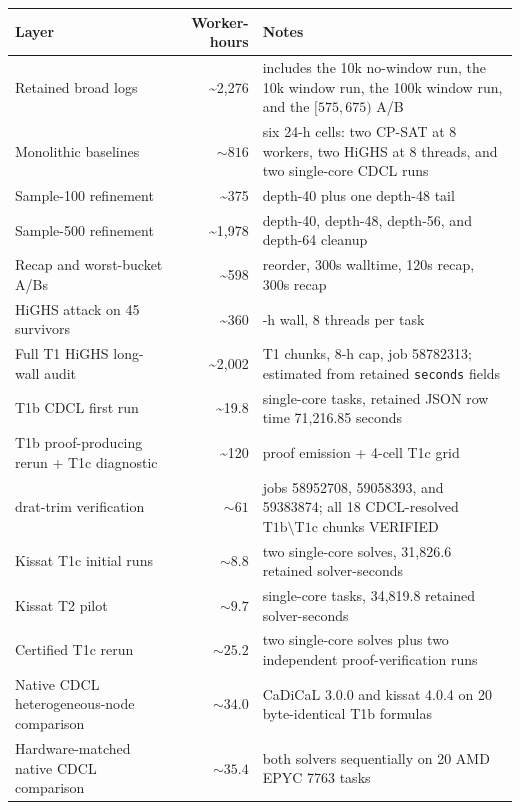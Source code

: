 {\def\LTcaptype{none} %
\begin{longtable}[]{@{}
  >{\raggedright\arraybackslash}p{}
  r
  >{\raggedright\arraybackslash}p{}@{}}
\toprule\noalign{}
Layer & Worker-hours & Notes \\
\midrule\noalign{}
\endhead
\bottomrule\noalign{}
\endlastfoot
Retained broad logs & \textasciitilde{}2,276 & includes the 10k no-window run, the 10k window run, the 100k window run, and the $[575,675)$ A/B \\
Monolithic baselines & $\sim816$ & six 24-h cells: two CP-SAT at 8 workers, two HiGHS at 8 threads, and two single-core CDCL runs \\
Sample-100 refinement & \textasciitilde{}375 & depth-40 plus one depth-48 tail \\
Sample-500 refinement & \textasciitilde{}1,978 & depth-40, depth-48, depth-56, and depth-64 cleanup \\
Recap and worst-bucket A/Bs & \textasciitilde{}598 & reorder, 300s walltime, 120s recap, 300s recap \\
HiGHS attack on 45 survivors & \textasciitilde{}360 & 1-h wall, 8 threads per task \\
Full T1 HiGHS long-wall audit & \textasciitilde{}2,002 & 45 T1 chunks, 8-h cap, job 58782313; estimated from retained \texttt{seconds} fields \\
T1b CDCL first run & \textasciitilde{}19.8 & 20 single-core tasks, retained JSON row time 71,216.85 seconds \\
T1b proof-producing rerun + T1c diagnostic & \textasciitilde{}120 & proof emission + 4-cell T1c grid \\
drat-trim verification & $\sim61$ & jobs 58952708, 59058393, and 59383874; all 18 CDCL-resolved $\mathrm{T1b}\setminus\mathrm{T1c}$ chunks VERIFIED \\
Kissat T1c initial runs & $\sim8.8$ & two single-core solves, 31,826.6 retained solver-seconds \\
Kissat T2 pilot & $\sim9.7$ & 100 single-core tasks, 34,819.8 retained solver-seconds \\
Certified T1c rerun & $\sim25.2$ & two single-core solves plus two independent proof-verification runs \\
Native CDCL heterogeneous-node comparison & $\sim34.0$ & CaDiCaL 3.0.0 and kissat 4.0.4 on 20 byte-identical T1b formulas \\
Hardware-matched native CDCL comparison & $\sim35.4$ & both solvers sequentially on 20 AMD EPYC 7763 tasks \\

\end{longtable}}
